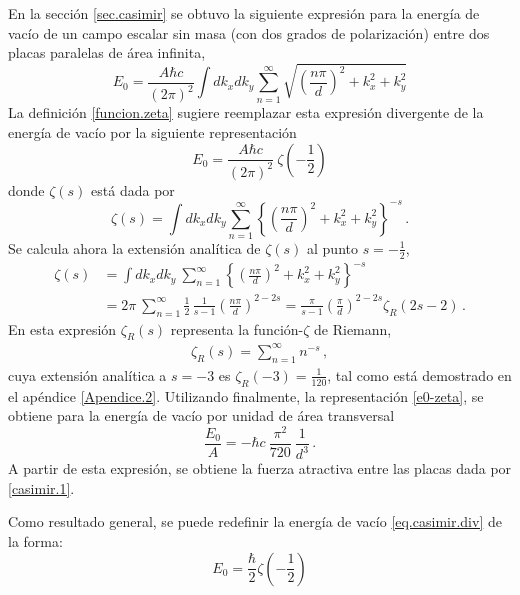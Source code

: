 En la sección \ref{sec.casimir} se obtuvo la siguiente expresión para la energía de vacío de un campo escalar sin masa (con dos grados de polarización) entre dos placas paralelas de área infinita,
\begin{equation}
E _0 = \frac{A \hbar c}{(2 \pi) ^2} \int dk _x dk _y 
\sum _{n=1} ^{\infty} 
\sqrt{
		\left( \frac{n \pi}{d} \right) ^2 + k _x ^2 + k _y ^2
		}
\end{equation}
La definición \eqref{funcion.zeta} sugiere reemplazar esta expresión divergente de la energía de vacío por la siguiente representación
\begin{equation}\label{e0-zeta}
E _0 = \frac{A \hbar c}{(2 \pi) ^2} 
\ \zeta \left( - \frac{1}{2} \right)
\end{equation}
donde $\zeta (s)$ está dada por
\begin{equation}
\zeta(s) = \int dk _x dk _y 
\sum _{n=1} ^{\infty} 
\left\{\left( \frac{n \pi}{d} \right) ^2 + k _x ^2 + k _y ^2\right\}^{-s}\,.
\end{equation}
Se calcula ahora la extensión analítica de $\zeta(s)$ al punto $s=-\frac12$,
\begin{align}
\zeta (s) &= 
\int dk _x dk _y 
\ \sum _{n=1} ^{\infty} 
\left\{	\left( \frac{n \pi}{d} \right) ^2 + k _x ^2 + k _y ^2
		\right\}^{-s} \nonumber\\[2mm]
&=2\pi\ \sum _{n=1} ^{\infty}  \frac12\,\frac{1}{s-1} \left( \frac{n \pi}{d} \right) ^{2-2s} =
\frac{\pi}{s-1} \left( \frac{\pi}{d} \right) ^{2-2s} \zeta_R (2s-2)\,.
\end{align}
En esta expresión $\zeta_R(s)$ representa la función-$\zeta$ de Riemann,
\begin{align}\label{rieman-zeta-def}
	\zeta_R(s)=\sum_{n=1}^\infty n^{-s}\,,
\end{align}
cuya extensión analítica a $s=-3$ es $\zeta_R(-3)=\frac{1}{120}$, tal como está demostrado en el apéndice \ref{Apendice.2}. Utilizando finalmente, la representación \eqref{e0-zeta}, se obtiene para la energía de vacío por unidad de área transversal
\begin{equation}
\frac{E _0}{A} = 
- \hbar c\ \frac{ \pi ^2}{720}\ \frac{1}{d^3}\,.
\end{equation}
A partir de esta expresión, se obtiene la fuerza atractiva entre las placas dada por \eqref{casimir.1}.

\bigskip

Como resultado general, se puede redefinir la energía de vacío \ref{eq.casimir.div} de la forma:
\begin{equation}
E _0 = \frac{\hbar}{2} \zeta  \left (- \frac{1}{2} \right) 
\label{eq.casimir.no.mu}
\end{equation}

